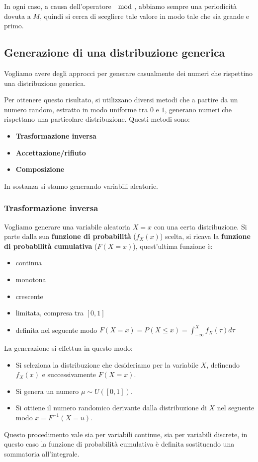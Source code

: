 In ogni caso, a causa dell'operatore $\mod$, abbiamo sempre una periodicità dovuta
a $M$, quindi si cerca di scegliere tale valore in modo tale che sia grande e primo.
\subsection{Generazione di una distribuzione generica}
Vogliamo avere degli approcci per generare casualmente dei numeri che rispettino
una distribuzione generica.

Per ottenere questo risultato, si utilizzano diversi metodi che a partire da un
numero random, estratto in modo uniforme tra $0$ e $1$, generano numeri che rispettano
una particolare distribuzione. Questi metodi sono:
\begin{itemize}
    \item \textbf{Trasformazione inversa}
    \item \textbf{Accettazione/rifiuto}
    \item \textbf{Composizione}
\end{itemize}
In sostanza si stanno generando variabili aleatorie.
\subsubsection{Trasformazione inversa}
Vogliamo generare una variabile aleatoria $X = x$ con una certa distribuzione.
Si parte dalla sua \textbf{funzione di probabilità} ($f_X(x)$) scelta, si ricava
la \textbf{funzione di probabilità cumulativa} ($F(X = x)$), quest'ultima funzione è:
\begin{itemize}
    \item continua
    \item monotona
    \item crescente
    \item limitata, compresa tra $[0,1]$
    \item definita nel seguente modo $F(X=x) =P(X \leq x) = \int_{-\infty}^X f_X(\tau) d\tau$
\end{itemize}
La generazione si effettua in questo modo:
\begin{itemize}
    \item Si seleziona la distribuzione che desideriamo per la variabile $X$,
          definendo $f_X(x)$ e successivamente $F(X=x)$.
    \item Si genera un numero $\mu \sim U([0,1])$.
    \item Si ottiene il numero randomico derivante dalla distribuzione di $X$
          nel seguente modo $x = F^{-1}(X=u)$.
\end{itemize}
Questo procedimento vale sia per variabili continue, sia per variabili discrete,
in questo caso la funzione di probabilità cumulativa è definita sostituendo una
sommatoria all'integrale.

